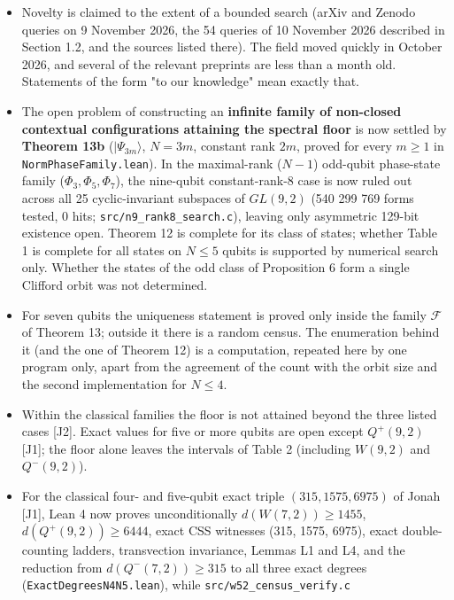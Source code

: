 \documentclass[11pt,a4paper]{article}
\providecommand{\tightlist}{\setlength{\itemsep}{0pt}\setlength{\parskip}{0pt}}
\begin{document}
\begin{itemize}
\tightlist
\item
  Novelty is claimed to the extent of a bounded search (arXiv and Zenodo queries on 9 November 2026,
  the 54 queries of 10 November 2026 described in Section 1.2, and the sources listed there). The field
  moved quickly in October 2026, and several of the relevant preprints are less than a month old.
  Statements of the form "to our knowledge" mean exactly that.
\item
  The open problem of constructing an \textbf{infinite family of non-closed contextual configurations attaining
  the spectral floor} is now settled by \textbf{Theorem 13b} (\(|\Psi_{3m}\rangle\), \(N=3m\), constant rank \(2m\),
  proved for every \(m\ge1\) in \nolinkurl{NormPhaseFamily.lean}). In the maximal-rank (\(N-1\)) odd-qubit phase-state
  family (\(\Phi_3, \Phi_5, \Phi_7\)), the nine-qubit constant-rank-8 case is now ruled out across all 25
  cyclic-invariant subspaces of \(GL(9,2)\) (540 299 769 forms tested, 0 hits; \nolinkurl{src/n9_rank8_search.c}),
  leaving only asymmetric 129-bit existence open. Theorem 12 is complete for its class of states; whether
  Table 1 is complete for all states on \(N \le 5\) qubits is supported by numerical search only. Whether
  the states of the odd class of Proposition 6 form a single Clifford orbit was not determined.
\item
  For seven qubits the uniqueness statement is proved only inside the family \(\mathcal{F}\) of
  Theorem 13; outside it there is a random census. The enumeration behind it (and the one of
  Theorem 12) is a computation, repeated here by one program only, apart from the agreement of the
  count with the orbit size and the second implementation for \(N \le 4\).
\item
  Within the classical families the floor is not attained beyond the three listed cases {[}J2{]}. Exact
  values for five or more qubits are open except \(Q^+(9,2)\) {[}J1{]}; the floor alone leaves the intervals
  of Table 2 (including \(W(9,2)\) and \(Q^-(9,2)\)).
\item
  For the classical four- and five-qubit exact triple \((315, 1575, 6975)\) of Jonah {[}J1{]}, Lean 4 now
  proves unconditionally \(d(W(7,2)) \ge 1455\), \(d(Q^+(9,2)) \ge 6444\), exact CSS witnesses (315, 1575,
  6975), exact double-counting ladders, transvection invariance, Lemmas L1 and L4, and the reduction from
  \(d(Q^-(7,2)) \ge 315\) to all three exact degrees (\nolinkurl{ExactDegreesN4N5.lean}), while \nolinkurl{src/w52_census_verify.c}

\end{itemize}
\end{document}
